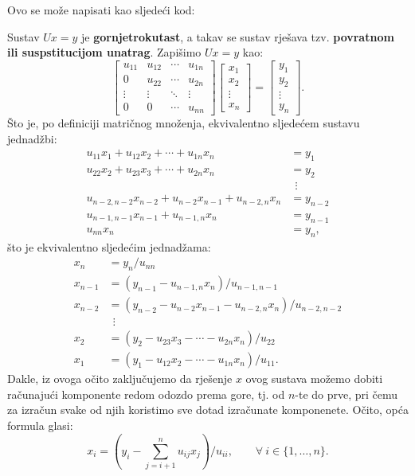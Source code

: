 \documentclass[a4paper,12pt,oneside]{article}
\begin{document}
\noindent Ovo se može napisati kao sljedeći kod: 



\noindent Sustav $Ux = y$ je \textbf{gornjetrokutast}, a takav se sustav rješava tzv. \textbf{povratnom ili suspstitucijom unatrag}.
\newline \newline Zapišimo $Ux = y$ kao:
$$
\left[\begin{matrix}u_{11} & u_{12} & \cdots & u_{1n}\\
	0 & u_{22} & \cdots & u_{2n}\\
	\vdots & \vdots & \ddots & \vdots\\
	0 & 0 & \cdots &u_{nn}\end{matrix}\right] \left[\begin{matrix}x_{1} \\ x_{2} \\ \vdots \\ x_{n}\end{matrix}\right]=\left[\begin{matrix}y_{1} \\ y_{2} \\ \vdots \\ y_{n}\end{matrix}\right].
$$
Što je, po definiciji matričnog množenja, ekvivalentno sljedećem sustavu jednadžbi:
\begin{align*}
	u_{11}x_1 + u_{12}x_2 + \cdots + u_{1n}x_n &= y_1 \\
	u_{22}x_2 + u_{23}x_3 + \cdots + u_{2n}x_n &= y_2 \\		
	          & \ \ \vdots \\
	u_{n-2,n-2}x_{n-2} + u_{n-2}x_{n-1}+u_{n-2,n}x_n &= y_{n-2} \\
	u_{n-1,n-1}x_{n-1}+u_{n-1,n}x_n &= y_{n-1} \\
	u_{nn}x_n &= y_n,
\end{align*}
što je ekvivalentno sljedećim jednadžama:
\begin{align*}
	x_n &= y_n/u_{nn}\\
	x_{n-1} &=(y_{n-1} -u_{n-1,n}x_n)/u_{n-1,n-1} \\
	x_{n-2} &=(y_{n-2} -u_{n-2}x_{n-1}-u_{n-2,n}x_n) /u_{n-2,n-2} \\
	& \ \ \vdots \\
	x_2 &= (y_2 -u_{23}x_3 - \cdots - u_{2n}x_n)/u_{22} \\
	x_1 &=(y_1 -u_{12}x_2 - \cdots - u_{1n}x_n)/u_{11}. 
\end{align*}
Dakle, iz ovoga očito zaključujemo da rješenje $x$ ovog sustava možemo dobiti računajući komponente redom odozdo prema gore, tj. od $n$-te do prve, pri čemu za izračun svake od njih koristimo sve dotad izračunate komponenete. Očito, opća formula glasi:
$$x_i = \left(y_i - \sum_{j=i+1}^{n}u_{ij}x_j\right)\big /u_{ii}, \qquad \forall \ i \in \{1, \dots, n\}.$$
\end{document}
